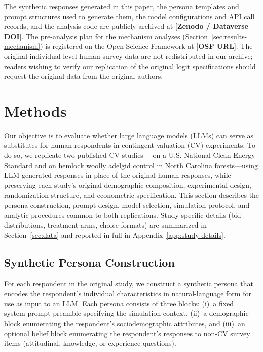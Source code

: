 \documentclass[12pt]{article}
\begin{document}
The synthetic responses generated in this paper, the persona templates and prompt structures used to generate them, the model configurations and API call records, and the analysis code are publicly archived at [\textbf{Zenodo / Dataverse DOI}]. The pre-analysis plan for the mechanism analyses (Section~\ref{sec:results-mechanism}) is registered on the Open Science Framework at [\textbf{OSF URL}]. The original individual-level human-survey data are not redistributed in our archive; readers wishing to verify our replication of the original logit specifications should request the original data from the original authors.



\section{Methods}\label{sec:methods}

Our objective is to evaluate whether large language models (LLMs) can serve as substitutes for human respondents in contingent valuation (CV) experiments. To do so, we replicate two published CV studies---\textcite{Aldy2012} on a U.S. National Clean Energy Standard and \textcite{Giguere2020} on hemlock woolly adelgid control in North Carolina forests---using LLM-generated responses in place of the original human responses, while preserving each study's original demographic composition, experimental design, randomization structure, and econometric specification. This section describes the persona construction, prompt design, model selection, simulation protocol, and analytic procedures common to both replications. Study-specific details (bid distributions, treatment arms, choice formats) are summarized in Section~\ref{sec:data} and reported in full in Appendix~\ref{app:study-details}.

\subsection{Synthetic Persona Construction}\label{sec:methods-persona}

For each respondent in the original study, we construct a synthetic persona that encodes the respondent's individual characteristics in natural-language form for use as input to an LLM. Each persona consists of three blocks: (i)~a fixed system-prompt preamble specifying the simulation context, (ii)~a demographic block enumerating the respondent's sociodemographic attributes, and (iii)~an optional belief block enumerating the respondent's responses to non-CV survey items (attitudinal, knowledge, or experience questions).
\end{document}
